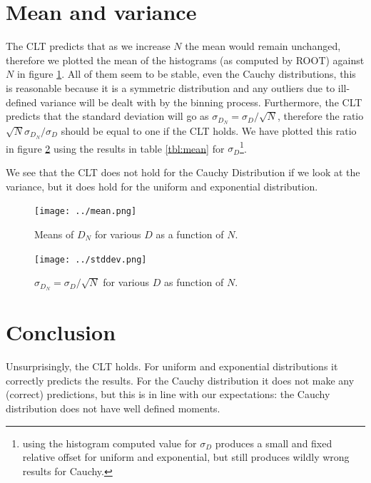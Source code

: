 \documentclass[notitlepage, 12pt, a4paper, twoside, titlepage]{article}
\begin{document}
\section{Mean and variance}
The CLT predicts that as we increase $N$ the mean would remain unchanged, therefore we plotted the mean of the histograms (as computed by ROOT) against $N$ in figure \ref{fig:mean}. All of them seem to be stable, even the Cauchy distributions, this is reasonable because it is a symmetric distribution and any outliers
due to ill-defined variance will be dealt with by the binning process.
Furthermore, the CLT predicts that the standard deviation will go as $\sigma_{D_N} = \sigma_D/\sqrt{N}$, therefore the ratio $\sqrt{N}\sigma_{D_N}/\sigma_{D}$ should be equal to one if the CLT holds. We have plotted this ratio in figure \ref{fig:stddev} using the results in table \ref{tbl:mean} for $\sigma_D$\footnote{using the histogram computed value for $\sigma_D$ produces a small and fixed relative offset for uniform and exponential, but still produces wildly wrong results for Cauchy.}.
\par We see that the CLT does not hold for the Cauchy Distribution if we look at the variance, but it does hold for the uniform and exponential distribution.

\begin{figure}[h!]
  \texttt{[image: ../mean.png]}
  \caption{Means of $D_N$ for various $D$ as a function of $N$.}
  \label{fig:mean}
\end{figure}

\begin{figure}[h!]
  \texttt{[image: ../stddev.png]}
  \caption{ $\sigma_{D_N} = \sigma_D/\sqrt{N}$ for various $D$ as function of $N$.}
  \label{fig:stddev}
\end{figure}

\section{Conclusion}
Unsurprisingly, the CLT holds. For uniform and exponential distributions it correctly predicts the results. For the Cauchy distribution it does not make any (correct) predictions, but this is in line with our expectations: the Cauchy distribution does not have well defined moments.
\end{document}
